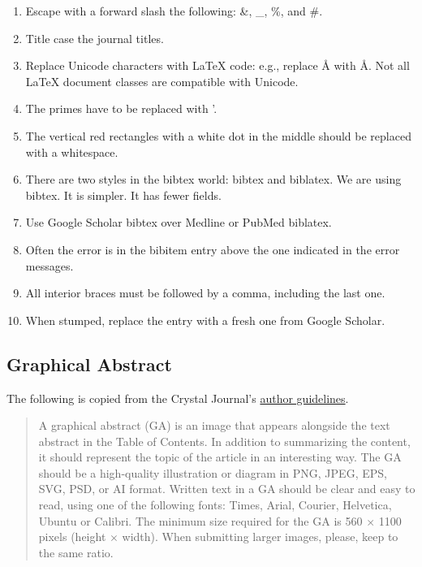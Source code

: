 \documentclass[10pt,letterpaper]{article}
\newcommand{\be}{\begin{enumerate}}
\newcommand{\ee}{\end{enumerate}}
\begin{document}
\be
\item Escape with a forward slash the following: \&, \_, \%, and \#. 
\item Title case the journal titles.
\item Replace Unicode characters with LaTeX code: e.g., replace Å with \AA. Not all LaTeX document classes are compatible with Unicode.
\item The primes have to be replaced with '.
\item The vertical red rectangles with a white dot in the middle should be replaced with a whitespace.
\item There are two styles in the bibtex world: bibtex and biblatex. We are using bibtex. It is simpler. It has fewer fields.
\item Use Google Scholar bibtex over Medline or PubMed biblatex. 
\item Often the error is in the bibitem entry above the one indicated in the error messages.
\item All interior braces must be followed by a comma, including the last one.
\item When stumped, replace the entry with a fresh one from Google Scholar.
\ee



\subsection{Graphical Abstract}
\label{subsec:guides:graphicalAbstract}


The following is copied from the Crystal Journal's \href{https://www.mdpi.com/journal/crystals/instructions#preparation}{author guidelines}.

\begin{quote}
A graphical abstract (GA) is an image that appears alongside the text abstract in the Table of Contents. 
In addition to summarizing the content, it should represent the topic of the article in an interesting way.
The GA should be a high-quality illustration or diagram in PNG, JPEG, EPS, SVG, PSD, or AI format. 
Written text in a GA should be clear and easy to read, using one of the following fonts: Times, Arial, Courier, Helvetica, Ubuntu or Calibri.
The minimum size required for the GA is 560 $\times$ 1100 pixels (height $\times$ width). 
When submitting larger images, please, keep to the same ratio.
\end{quote}

\end{document}
